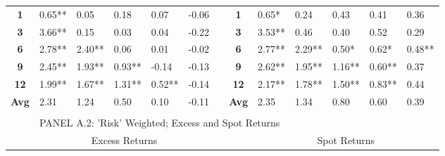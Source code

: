 \documentclass{article}
\begin{document}
\begin{table}[htbp!]
\begin{adjustwidth}{-2cm}{}
\begin{tabular}{ccccccccccccc}
\cmidrule{2-6}\cmidrule{9-13}    \textbf{1} & \multicolumn{1}{l}{0.65**} & \multicolumn{1}{l}{0.05} & \multicolumn{1}{l}{0.18} & \multicolumn{1}{l}{0.07} & \multicolumn{1}{l}{-0.06} &       & \textbf{1} & \multicolumn{1}{l}{0.65*} & \multicolumn{1}{l}{0.24} & \multicolumn{1}{l}{0.43} & \multicolumn{1}{l}{0.41} & \multicolumn{1}{l}{0.36} \\
    \textbf{3} & \multicolumn{1}{l}{3.66**} & \multicolumn{1}{l}{0.15} & \multicolumn{1}{l}{0.03} & \multicolumn{1}{l}{0.04} & \multicolumn{1}{l}{-0.22} &       & \textbf{3} & \multicolumn{1}{l}{3.53**} & \multicolumn{1}{l}{0.46} & \multicolumn{1}{l}{0.40} & \multicolumn{1}{l}{0.52} & \multicolumn{1}{l}{0.29} \\
    \textbf{6} & \multicolumn{1}{l}{2.78**} & \multicolumn{1}{l}{2.40**} & \multicolumn{1}{l}{0.06} & \multicolumn{1}{l}{0.01} & \multicolumn{1}{l}{-0.02} &       & \textbf{6} & \multicolumn{1}{l}{2.77**} & \multicolumn{1}{l}{2.29**} & \multicolumn{1}{l}{0.50*} & \multicolumn{1}{l}{0.62*} & \multicolumn{1}{l}{0.48**} \\
    \textbf{9} & \multicolumn{1}{l}{2.45**} & \multicolumn{1}{l}{1.93**} & \multicolumn{1}{l}{0.93**} & \multicolumn{1}{l}{-0.14} & \multicolumn{1}{l}{-0.13} &       & \textbf{9} & \multicolumn{1}{l}{2.62**} & \multicolumn{1}{l}{1.95**} & \multicolumn{1}{l}{1.16**} & \multicolumn{1}{l}{0.60**} & \multicolumn{1}{l}{0.37} \\
    \textbf{12} & \multicolumn{1}{l}{1.99**} & \multicolumn{1}{l}{1.67**} & \multicolumn{1}{l}{1.31**} & \multicolumn{1}{l}{0.52**} & \multicolumn{1}{l}{-0.14} &       & \textbf{12} & \multicolumn{1}{l}{2.17**} & \multicolumn{1}{l}{1.78**} & \multicolumn{1}{l}{1.50**} & \multicolumn{1}{l}{0.83**} & \multicolumn{1}{l}{0.44} \\
\cmidrule{2-6}\cmidrule{9-13}    \textbf{Avg} & \multicolumn{1}{l}{2.31} & \multicolumn{1}{l}{1.24} & \multicolumn{1}{l}{0.50} & \multicolumn{1}{l}{0.10} & \multicolumn{1}{l}{-0.11} &       & \textbf{Avg} & \multicolumn{1}{l}{2.35} & \multicolumn{1}{l}{1.34} & \multicolumn{1}{l}{0.80} & \multicolumn{1}{l}{0.60} & \multicolumn{1}{l}{0.39} \\
    \midrule
          &       &       &       &       &       &       &       &       &       &       &       &  \\
    \midrule
          & \multicolumn{12}{l}{PANEL A.2: 'Risk' Weighted; Excess and Spot Returns} \\
    \midrule
          & \multicolumn{5}{c}{Excess Returns}    &       &       & \multicolumn{5}{c}{Spot Returns} \\

\end{tabular}
\end{adjustwidth}
\end{table}
\end{document}
